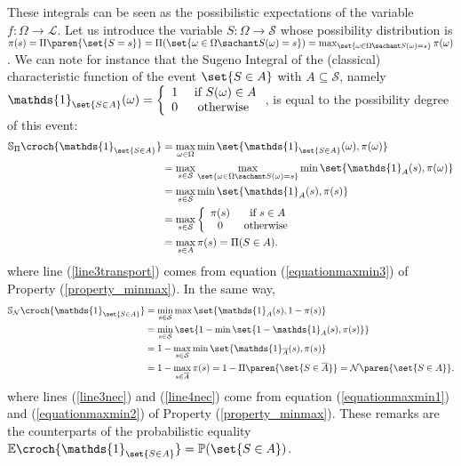 These integrals can be seen as the possibilistic expectations of the variable $f: \Omega \rightarrow \mathcal{L}$.
Let us introduce the variable $S: \Omega \rightarrow \mathcal{S}$
whose possibility distribution is $\pi(s) = \Pi \paren{ \set{S = s} } = \Pi(\set{ \omega \in \Omega \sachant S(\omega) = s }) = \max_{\set{\omega \in \Omega \sachant S(\omega) = s} } \pi(\omega)$.
We can note for instance that the Sugeno Integral of the (classical) characteristic function of the event $\set{ S \in A}$ with $A \subseteq \mathcal{S}$,
namely $\mathds{1}_{\set{S \in A}}(\omega) =  \left \{ \begin{array}{ccc} 1 & \mbox{ if } S(\omega) \in A \\ 0 & \mbox{ otherwise } \end{array} \right.$, is equal to the possibility degree of this event:
\begin{align}
\nonumber \mathbb{S}_{\Pi} \croch{ \mathds{1}_{\set{S \in A}} } &= \max_{\omega \in \Omega} \min \set{ \mathds{1}_{ \set{S \in A}}(\omega), \pi(\omega) } \\
\nonumber&= \max_{s \in \mathcal{S}} \max_{\set{\omega \in \Omega \sachant S(\omega)=s} } \min \set{ \mathds{1}_{A}(s), \pi(\omega) } \\
\label{line3transport} &= \max_{s \in \mathcal{S}} \min \set{ \mathds{1}_{A}(s), \pi(s) } \\
\nonumber&= \max_{s \in \mathcal{S}} \left \{ \begin{array}{ccc} \pi(s) & \mbox{ if } s \in A \\ 0 & \mbox{ otherwise } \end{array} \right. \\
\label{sugenoIntCharFunc_poss} &= \max_{s \in A} \pi(s) = \Pi(S \in A).
\end{align}
where line (\ref{line3transport}) comes from equation (\ref{equationmaxmin3}) of Property (\ref{property_minmax}).
In the same way, 
\begin{align}
\nonumber \mathbb{S}_{\mathcal{N}} \croch{ \mathds{1}_{\set{S \in A}} } &= \min_{s \in \mathcal{S}} \max \set{ \mathds{1}_{A}(s), 1 - \pi(s) } \\
\label{line3nec} &= \min_{s \in \mathcal{S}} \set{ 1 - \min \set{ 1 - \mathds{1}_{A}(s), \pi(s) } } \\
\label{line4nec} &= 1 -\max_{s \in \mathcal{S}} \min \set{ \mathds{1}_{\overline{A}}(s), \pi(s) } \\
\nonumber &= 1 - \max_{s \in \overline{A}} \pi(s) = 1 - \Pi \paren{ \set{S \in \overline{A}} } = \mathcal{N} \paren{ \set{S \in A}}.
\end{align}
where lines (\ref{line3nec}) and (\ref{line4nec}) come from equation 
(\ref{equationmaxmin1}) and (\ref{equationmaxmin2}) 
of Property (\ref{property_minmax}).
These remarks are the counterparts of the probabilistic equality $\mathbb{E} \croch{ \mathds{1}_{\set{S \in A}} } = \mathbb{P}( \set{S\in A})$.

